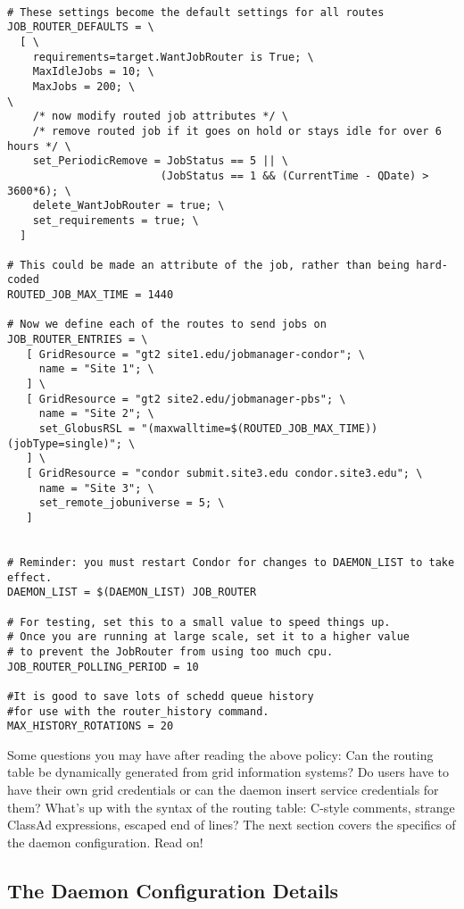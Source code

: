 \begin{verbatim}

# These settings become the default settings for all routes
JOB_ROUTER_DEFAULTS = \
  [ \
    requirements=target.WantJobRouter is True; \
    MaxIdleJobs = 10; \
    MaxJobs = 200; \
\
    /* now modify routed job attributes */ \
    /* remove routed job if it goes on hold or stays idle for over 6 hours */ \
    set_PeriodicRemove = JobStatus == 5 || \
                        (JobStatus == 1 && (CurrentTime - QDate) > 3600*6); \
    delete_WantJobRouter = true; \
    set_requirements = true; \
  ]

# This could be made an attribute of the job, rather than being hard-coded
ROUTED_JOB_MAX_TIME = 1440

# Now we define each of the routes to send jobs on
JOB_ROUTER_ENTRIES = \
   [ GridResource = "gt2 site1.edu/jobmanager-condor"; \
     name = "Site 1"; \
   ] \
   [ GridResource = "gt2 site2.edu/jobmanager-pbs"; \
     name = "Site 2"; \
     set_GlobusRSL = "(maxwalltime=$(ROUTED_JOB_MAX_TIME))(jobType=single)"; \
   ] \
   [ GridResource = "condor submit.site3.edu condor.site3.edu"; \
     name = "Site 3"; \
     set_remote_jobuniverse = 5; \
   ]


# Reminder: you must restart Condor for changes to DAEMON_LIST to take effect.
DAEMON_LIST = $(DAEMON_LIST) JOB_ROUTER

# For testing, set this to a small value to speed things up.
# Once you are running at large scale, set it to a higher value
# to prevent the JobRouter from using too much cpu.
JOB_ROUTER_POLLING_PERIOD = 10

#It is good to save lots of schedd queue history
#for use with the router_history command.
MAX_HISTORY_ROTATIONS = 20
\end{verbatim}


Some questions you may have after reading the above policy: Can the
routing table be dynamically generated from grid information systems?
Do users have to have their own grid credentials or can the  daemon
insert service credentials for them?  What's up with the syntax of the
routing table: C-style comments, strange ClassAd expressions, escaped
end of lines?  The next section covers the specifics of the  daemon
configuration.  Read on!

\subsection{The \Condor{job\_router} Daemon Configuration Details}

